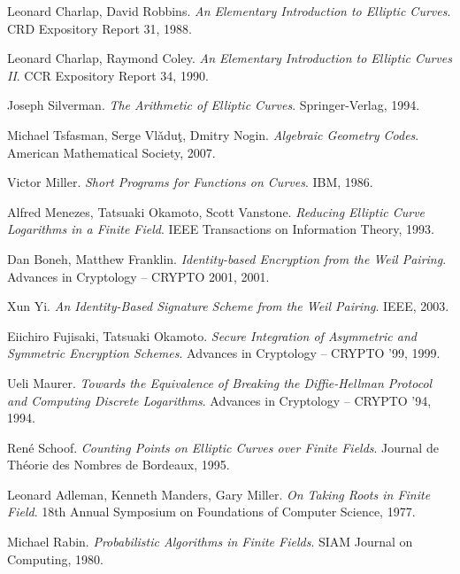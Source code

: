\begin{thebibliography}{99}

    Leonard Charlap, David Robbins.
    \emph{An Elementary Introduction to Elliptic Curves}.
    CRD Expository Report 31, 1988.

    Leonard Charlap, Raymond Coley.
    \emph{An Elementary Introduction to Elliptic Curves II}.
    CCR Expository Report 34, 1990.

    Joseph Silverman.
    \emph{The Arithmetic of Elliptic Curves}.
    Springer-Verlag, 1994.

    Michael Tsfasman, Serge  Vl\v{a}du\c{t}, Dmitry Nogin.
    \emph{Algebraic Geometry Codes}.
    American Mathematical Society, 2007.

    Victor Miller.
    \emph{Short Programs for Functions on Curves}.
    IBM, 1986.

    Alfred Menezes, Tatsuaki Okamoto, Scott Vanstone.
    \emph{Reducing Elliptic Curve Logarithms in a Finite Field}.
    IEEE Transactions on Information Theory, 1993.

    Dan Boneh, Matthew Franklin.
    \emph{Identity-based Encryption from the Weil Pairing}.
    Advances in Cryptology -- CRYPTO 2001, 2001.

    Xun Yi.
    \emph{An Identity-Based Signature Scheme from the Weil Pairing}.
    IEEE, 2003.

    Eiichiro Fujisaki, Tatsuaki Okamoto.
    \emph{Secure Integration of Asymmetric and Symmetric Encryption Schemes}.
    Advances in Cryptology -- CRYPTO '99, 1999.

    Ueli Maurer.
    \emph{Towards the Equivalence of Breaking the Diffie-Hellman Protocol
        and Computing Discrete Logarithms}.
    Advances in Cryptology -- CRYPTO '94, 1994.

    René Schoof.
    \emph{Counting Points on Elliptic Curves over Finite Fields}.
    Journal de Théorie des Nombres de Bordeaux, 1995.

    Leonard Adleman, Kenneth Manders, Gary Miller.
    \emph{On Taking Roots in Finite Field}.
    18th Annual Symposium on Foundations of Computer Science, 1977.

    Michael Rabin.
    \emph{Probabilistic Algorithms in Finite Fields}.
    SIAM Journal on Computing, 1980.


\end{thebibliography}

